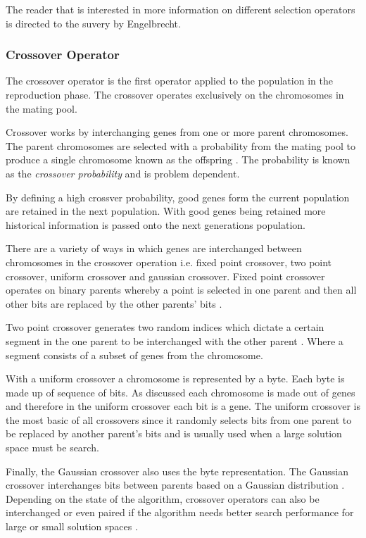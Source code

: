 The reader that is interested in more information on different selection operators is directed to the suvery by Engelbrecht\cite{CompuIntelligenceIntro}.
\subsubsection{Crossover Operator}
\label{sec:crossover}
The crossover operator is the first operator applied to the population in the reproduction phase. The crossover operates exclusively on the chromosomes in the mating pool. 

Crossover works by interchanging genes from one or more parent chromosomes. The parent chromosomes are selected with a probability from the mating pool to produce a single chromosome known as the offspring \cite{FamilyGA,HumanPassiveGA,CoactiveFuzzyGA}. The probability is known as the \emph{crossover probability} and is problem dependent\cite{CompuIntelligenceIntro}.

By defining a high crossver probability, good genes form the current population are retained in the next population\cite{CompuIntelligenceIntro}. With good genes being retained more historical information is passed onto the next generations population\cite{FamilyGA}.

There are a variety of ways in which genes are interchanged between chromosomes in the crossover operation i.e. fixed point crossover, two point crossover, uniform crossover and gaussian crossover\cite{CompuIntelligenceIntro}. Fixed point crossover operates on binary parents whereby a point is selected in one parent and then all other bits are replaced by the other parents' bits \cite{HumanPassiveGA}. 

Two point crossover generates two random indices which dictate a certain segment in the one parent to be interchanged with the other parent \cite{ConstrainedGA}. Where a segment consists of a subset of genes from the chromosome. 

With a uniform crossover a chromosome is represented by a byte\cite{CompuIntelligenceIntro}. Each byte is made up of sequence of bits. As discussed each chromosome is made out of genes and therefore in the uniform crossover each bit is a gene\cite{CompuIntelligenceIntro}. The uniform crossover is the most basic of all crossovers since it randomly selects bits from one parent to be replaced by another parent's bits and is usually used when a large solution space must be search\cite{ParallelGASA,GeostatisticalGA}. 

Finally, the Gaussian crossover also uses the byte representation. The Gaussian crossover interchanges bits between parents based on a Gaussian distribution \cite{ParallelGASA,GeostatisticalGA}. Depending on the state of the algorithm, crossover operators can also be interchanged or even paired if the algorithm needs better search performance for large or small solution spaces \cite{HetergeneousGA,ParallelGASA}.

